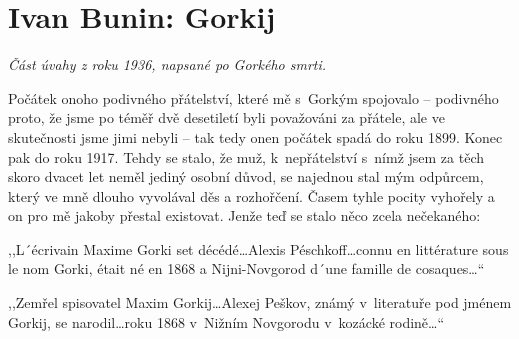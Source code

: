 \section{Ivan Bunin: Gorkij}

\noindent
\textit{Část úvahy z roku 1936, napsané po Gorkého smrti.}

\medskip

\noindent
Počátek onoho podivného přátelství, které mě s Gorkým spojovalo -- podivného proto, že jsme po téměř dvě desetiletí byli považováni za přátele, ale ve skutečnosti jsme jimi nebyli -- tak tedy onen počátek spadá do roku 1899. Konec pak do roku 1917. Tehdy se stalo, že muž, k nepřátelství s nímž jsem za těch skoro dvacet let neměl jediný osobní důvod, se najednou stal mým odpůrcem, který ve mně dlouho vyvolával děs a rozhořčení. Časem tyhle pocity vyhořely a on pro mě jakoby přestal existovat. Jenže teď se stalo něco zcela nečekaného:

\medskip

\noindent
,,L´écrivain Maxime Gorki set décédé\ldots Alexis Péschkoff\ldots connu en littérature sous le nom Gorki, était né en 1868 a Nijni-Novgorod d´une famille de cosaques\ldots``

\noindent
,,Zemřel spisovatel Maxim Gorkij\ldots Alexej Peškov, známý v literatuře pod jménem Gorkij, se narodil\ldots roku 1868 v Nižním Novgorodu v kozácké rodině\ldots``

\medskip

